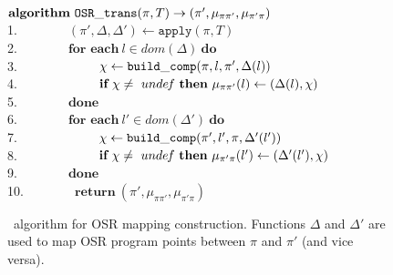 \else
\begin{figure}
\noindent
\begin{small}
\hphantom{xxx} $\textbf{algorithm}~\text{${\tt OSR\_trans}$}(\pi, T)\rightarrow (\pi',\mu_{\pi\pi'},\mu_{\pi'\pi})$ \\
1.\hphantom{0} ~~ ~~~~ $(\pi',\Delta,\Delta')\gets \texttt{apply}(\pi,T)$ \\
2.\hphantom{0} ~~ ~~~~ $\textbf{for each}~l\in dom(\Delta)~\textbf{do}$ \\
3.\hphantom{0} ~~ ~~~~ ~~~~ $\chi\gets\text{${\tt build\_comp}$}(\pi,l,\pi',\Delta(l))$ \\
4.\hphantom{0} ~~ ~~~~ ~~~~ $\textbf{if}~\chi\neq~unde\hspace{-0.1em}f~\textbf{then}~\mu_{\pi\pi'}(l)\gets(\Delta(l),\chi)$ \\
5.\hphantom{0} ~~ ~~~~ $\textbf{done}$\\
6.\hphantom{0} ~~ ~~~~ $\textbf{for each}~l'\in dom(\Delta')~\textbf{do}$ \\
7.\hphantom{0} ~~ ~~~~ ~~~~ $\chi\gets\text{${\tt build\_comp}$}(\pi',l',\pi,\Delta'(l'))$ \\
8.\hphantom{0} ~~ ~~~~ ~~~~ $\textbf{if}~\chi\neq~unde\hspace{-0.1em}f~\textbf{then}~\mu_{\pi'\pi}(l')\gets(\Delta'(l'),\chi)$ \\
9.\hphantom{0} ~~ ~~~~ $\textbf{done}$\\
10. ~~ ~~~~ $\textbf{return}~(\pi',\mu_{\pi\pi'},\mu_{\pi'\pi})$ \\
\end{small}
\caption{\osrtrans\ algorithm for OSR mapping construction. Functions $\Delta$ and $\Delta'$ are used to map OSR program points between $\pi$ and $\pi'$ (and vice versa).}
\label{alg:osr-trans}
\end{figure}
\fi


